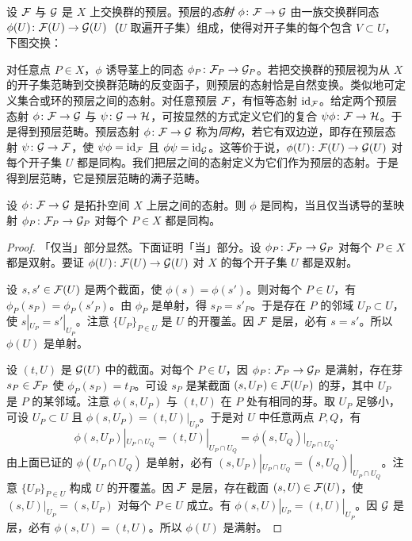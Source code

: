 设 $\mathcal{F}$ 与 $\mathcal{G}$ 是 $X$ 上交换群的预层。预层的\emph{态射} $\phi\colon \mathcal{F}\to \mathcal{G}$ 由一族交换群同态 $\phi(U)\colon \mathcal{F}(U)\to \mathcal{G}(U)$（$U$ 取遍开子集）组成，使得对开子集的每个包含 $V\subset U$，下图交换：
\begin{center}
\end{center}

对任意点 $P\in X$，$\phi$ 诱导茎上的同态 $\phi_P\colon \mathcal{F}_P\to \mathcal{G}_P$。若把交换群的预层视为从 $X$ 的开子集范畴到交换群范畴的反变函子，则预层的态射恰是自然变换。类似地可定义集合或环的预层之间的态射。对任意预层 $\mathcal{F}$，有恒等态射 $\operatorname{id}_{\mathcal{F}}$。给定两个预层态射 $\phi\colon \mathcal{F}\to \mathcal{G}$ 与 $\psi\colon \mathcal{G}\to \mathcal{H}$，可按显然的方式定义它们的复合 $\psi\phi\colon \mathcal{F}\to \mathcal{H}$。于是得到预层范畴。预层态射 $\phi\colon \mathcal{F}\to \mathcal{G}$ 称为\emph{同构}，若它有双边逆，即存在预层态射 $\psi\colon \mathcal{G}\to \mathcal{F}$，使 $\psi\phi=\operatorname{id}_{\mathcal{F}}$ 且 $\phi\psi=\operatorname{id}_{\mathcal{G}}$。这等价于说，$\phi(U)\colon \mathcal{F}(U)\to \mathcal{G}(U)$ 对每个开子集 $U$ 都是同构。我们把层之间的态射定义为它们作为预层的态射。于是得到层范畴，它是预层范畴的满子范畴。

\begin{proposition}\label{it:1.1.1}
设 $\phi\colon \mathcal{F}\to \mathcal{G}$ 是拓扑空间 $X$ 上层之间的态射。则 $\phi$ 是同构，当且仅当诱导的茎映射 $\phi_P\colon \mathcal{F}_P\to \mathcal{G}_P$ 对每个 $P\in X$ 都是同构。
\end{proposition}

\begin{proof}
「仅当」部分显然。下面证明「当」部分。设 $\phi_P\colon \mathcal{F}_P\to \mathcal{G}_P$ 对每个 $P\in X$ 都是双射。要证 $\phi(U)\colon \mathcal{F}(U)\to \mathcal{G}(U)$ 对 $X$ 的每个开子集 $U$ 都是双射。

设 $s,s'\in \mathcal{F}(U)$ 是两个截面，使 $\phi(s)=\phi(s')$。则对每个 $P\in U$，有 $\phi_P(s_P)=\phi_P(s'_P)$。由 $\phi_P$ 是单射，得 $s_P=s'_P$。于是存在 $P$ 的邻域 $U_P\subset U$，使 $s|_{U_P}=s'|_{U_P}$。注意 $\{U_P\}_{P\in U}$ 是 $U$ 的开覆盖。因 $\mathcal{F}$ 是层，必有 $s=s'$。所以 $\phi(U)$ 是单射。

设 $(t,U)$ 是 $\mathcal{G}(U)$ 中的截面。对每个 $P\in U$，因 $\phi_P\colon \mathcal{F}_P\to \mathcal{G}_P$ 是满射，存在芽 $s_P\in \mathcal{F}_P$ 使 $\phi_P(s_P)=t_P$。可设 $s_P$ 是某截面 $(s,U_P)\in \mathcal{F}(U_P)$ 的芽，其中 $U_P$ 是 $P$ 的某邻域。注意 $\phi(s,U_P)$ 与 $(t,U)$ 在 $P$ 处有相同的芽。取 $U_P$ 足够小，可设 $U_P\subset U$ 且 $\phi(s,U_P)=(t,U)|_{U_P}$。于是对 $U$ 中任意两点 $P,Q$，有
\[
\phi(s,U_P)|_{U_P\cap U_Q}=(t,U)|_{U_P\cap U_Q}=\phi(s,U_Q)|_{U_P\cap U_Q}.
\]
由上面已证的 $\phi(U_P\cap U_Q)$ 是单射，必有 $(s,U_P)|_{U_P\cap U_Q}=(s,U_Q)|_{U_P\cap U_Q}$。注意 $\{U_P\}_{P\in U}$ 构成 $U$ 的开覆盖。因 $\mathcal{F}$ 是层，存在截面 $(s,U)\in \mathcal{F}(U)$，使 $(s,U)|_{U_P}=(s,U_P)$ 对每个 $P\in U$ 成立。有 $\phi(s,U)|_{U_P}=(t,U)|_{U_P}$。因 $\mathcal{G}$ 是层，必有 $\phi(s,U)=(t,U)$。所以 $\phi(U)$ 是满射。
\end{proof}

